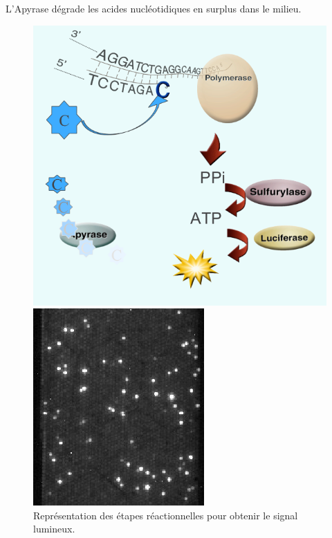 L'Apyrase dégrade les acides nucléotidiques en surplus dans le milieu.
~~\\
\newpage
\begin{figure}[!h]
   \begin{minipage}[b]{0.40\linewidth}
      \centering \includegraphics[scale=0.3]{Images/proces.png}
   \end{minipage}\hfill
   \begin{minipage}[b]{0.48\linewidth}   
      \centering \includegraphics[scale=0.4]{Images/454.png}
   \end{minipage}
   \caption{Représentation des étapes réactionnelles pour obtenir le signal lumineux.}
\end{figure}
